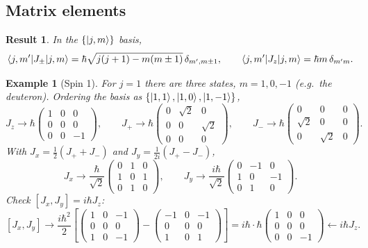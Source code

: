 \documentclass{article}
\newtheorem*{example}{Example}
\newtheorem{result}{Result}
\begin{document}
\subsection{Matrix elements}
\begin{result}
    In the $\{\ket{j,m}\}$ basis,
    \begin{equation}
        \braket{j,m'|J_\pm|j,m} = \hbar\sqrt{j(j+1) - m(m\pm1)}\,\delta_{m',m\pm1}, \qquad \braket{j,m'|J_z|j,m} = \hbar m\,\delta_{m'm}.
    \end{equation}
\end{result}
\begin{example}[Spin 1]
    For $j = 1$ there are three states, $m = 1, 0, -1$ (e.g.\ the deuteron). Ordering the basis as $\{\ket{1,1}, \ket{1,0}, \ket{1,-1}\}$,
    \[J_z \longrightarrow \hbar\begin{pmatrix} 1&0&0\\0&0&0\\0&0&-1 \end{pmatrix}, \qquad J_+ \longrightarrow \hbar\begin{pmatrix} 0&\sqrt{2}&0\\0&0&\sqrt{2}\\0&0&0 \end{pmatrix}, \qquad J_- \longrightarrow \hbar\begin{pmatrix} 0&0&0\\\sqrt{2}&0&0\\0&\sqrt{2}&0 \end{pmatrix}.\]
    With $J_x = \frac{1}{2}(J_+ + J_-)$ and $J_y = \frac{1}{2i}(J_+ - J_-)$,
    \[J_x \longrightarrow \frac{\hbar}{\sqrt{2}}\begin{pmatrix} 0&1&0\\1&0&1\\0&1&0 \end{pmatrix}, \qquad J_y \longrightarrow \frac{i\hbar}{\sqrt{2}}\begin{pmatrix} 0&-1&0\\1&0&-1\\0&1&0 \end{pmatrix}.\]
    Check $[J_x,J_y] = i\hbar J_z$:
    \[[J_x,J_y] \longrightarrow \frac{i\hbar^2}{2}\left[\begin{pmatrix} 1&0&-1\\0&0&0\\1&0&-1 \end{pmatrix} - \begin{pmatrix} -1&0&-1\\0&0&0\\1&0&1 \end{pmatrix}\right] = i\hbar\cdot\hbar\begin{pmatrix} 1&0&0\\0&0&0\\0&0&-1 \end{pmatrix} \longleftarrow i\hbar J_z.\]
\end{example}
\end{document}
